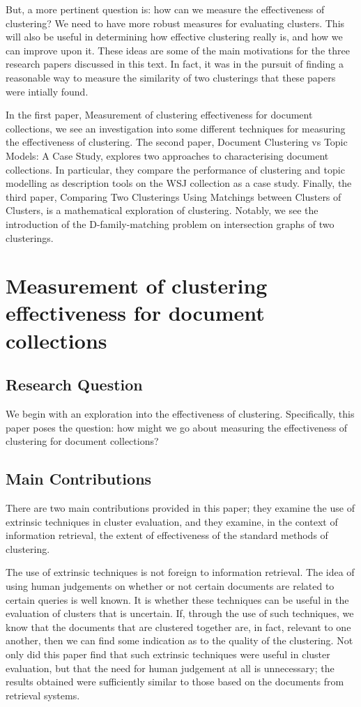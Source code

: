 \documentclass[sigconf,authorversion,nonacm]{acmart}
\begin{document}
But, a more pertinent question is: how can we measure the effectiveness of clustering? We need to have more robust
measures for evaluating clusters. This will also be useful in determining how effective clustering really is, and how we
can improve upon it. These ideas are some of the main motivations for the three research papers discussed in this text.
In fact, it was in the pursuit of finding a reasonable way to measure the similarity of two clusterings that these
papers were intially found. 

In the first paper, Measurement of clustering effectiveness for document collections\cite{Yuan2022}, we see an
investigation into some different techniques for measuring the effectiveness of clustering. The second paper, Document
Clustering vs Topic Models: A Case Study\cite{Yuan2021}, explores two approaches to characterising document collections.
In particular, they compare the performance of clustering and topic modelling as description tools on the WSJ collection
as a case study. Finally, the third paper, Comparing Two Clusterings Using Matchings between Clusters of
Clusters\cite{Cazals2019}, is a mathematical exploration of clustering. Notably, we see the introduction of the
D-family-matching problem on intersection graphs of two clusterings. \section{Measurement of clustering effectiveness
for document collections} \subsection{Research Question} We begin with an exploration into the effectiveness of
clustering. Specifically, this paper poses the question: how might we go about measuring the effectiveness of clustering
for document collections? \subsection{Main Contributions} There are two main contributions provided in this paper; they
examine the use of extrinsic techniques in cluster evaluation, and they examine, in the context of information
retrieval, the extent of effectiveness of the standard methods of clustering.

The use of extrinsic techniques is not foreign to information retrieval. The idea of using human judgements on whether
or not certain documents are related to certain queries is well known. It is whether these techniques can be useful in
the evaluation of clusters that is uncertain. If, through the use of such techniques, we know that the documents that
are clustered together are, in fact, relevant to one another, then we can find some indication as to the quality of the
clustering. Not only did this paper find that such extrinsic techniques were useful in cluster evaluation, but that the
need for human judgement at all is unnecessary; the results obtained were sufficiently similar to those based on the
documents from retrieval systems.
\end{document}
